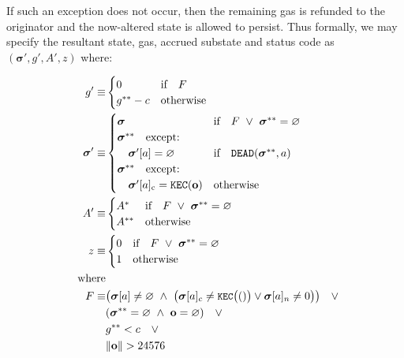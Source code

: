 \documentclass[9pt,oneside]{amsart}
\begin{document}
\begin{multicols}{2}
If such an exception does not occur, then the remaining gas is refunded to the originator and the now-altered state is allowed to persist. Thus formally, we may specify the resultant state, gas, accrued substate and status code as $(\boldsymbol{\sigma}', g', A', z)$ where:

\begin{align}
\quad g' \equiv & \begin{cases}
0 & \text{if} \quad F \\
g^{**} - c & \text{otherwise} \\
\end{cases} \\
\quad \boldsymbol{\sigma}' \equiv & \begin{cases}
\boldsymbol{\sigma} & \text{if} \quad F \ \lor\ \boldsymbol{\sigma}^{**} = \varnothing \\
\boldsymbol{\sigma}^{**} \quad \text{except:} & \\
\quad\boldsymbol{\sigma}'[a] = \varnothing & \text{if} \quad \mathtt{DEAD}(\boldsymbol{\sigma}^{**}, a) \\
\boldsymbol{\sigma}^{**} \quad \text{except:} & \\
\quad\boldsymbol{\sigma}'[a]_{\mathrm{c}} = \texttt{KEC}(\mathbf{o}) & \text{otherwise}
\end{cases} \\
\quad A' \equiv & \begin{cases}
A^* & \text{if} \quad F \ \lor\ \boldsymbol{\sigma}^{**} = \varnothing \\
A^{**} & \text{otherwise} \\
\end{cases} \\
\quad z \equiv & \begin{cases}
0 & \text{if} \quad F \ \lor\ \boldsymbol{\sigma}^{**} = \varnothing \\
1 & \text{otherwise}
\end{cases} \\
\nonumber \text{where} \\
F \equiv  & \big( \boldsymbol{\sigma}[a] \neq \varnothing \ \wedge\ \big(\boldsymbol{\sigma}[a]_c \neq \texttt{\small KEC}\big(()\big) \vee \boldsymbol{\sigma}[a]_n \neq 0 \big) \big) \quad \vee \\
\nonumber &(\boldsymbol{\sigma}^{**} = \varnothing \ \wedge\ \mathbf{o} = \varnothing) \quad \vee \\
\nonumber &g^{**} < c \quad \vee \\
\nonumber &\lVert \mathbf{o} \rVert > 24576
\end{align}
\hypertarget{contract_creation_result}{}


\end{multicols}
\end{document}
